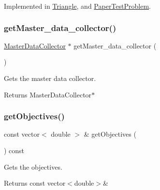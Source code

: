 Implemented in \mbox{\hyperlink{classTriangle_a9e95039d098fd61cce1a830b85ed7004_a9e95039d098fd61cce1a830b85ed7004}{Triangle}}, and \mbox{\hyperlink{classPaperTestProblem_a6db78df74d40f69a750b164caaca75c7_a6db78df74d40f69a750b164caaca75c7}{Paper\+Test\+Problem}}.

\mbox{\label{classProblem_a9bb7f0f4da14050f4a351e5ddb97c380_a9bb7f0f4da14050f4a351e5ddb97c380}} 
\subsubsection{\texorpdfstring{get\+Master\+\_\+data\+\_\+collector()}{getMaster\_data\_collector()}}
{\footnotesize\ttfamily \mbox{\hyperlink{classMasterDataCollector}{Master\+Data\+Collector}} $\ast$ get\+Master\+\_\+data\+\_\+collector (\begin{DoxyParamCaption}{ }\end{DoxyParamCaption})}



Gets the master data collector. 

\begin{DoxyReturn}{Returns}
Master\+Data\+Collector$\ast$ 
\end{DoxyReturn}
\mbox{\label{classProblem_aa10a0c69bf0a3d6a303c118c6fdfd5c6_aa10a0c69bf0a3d6a303c118c6fdfd5c6}} 
\subsubsection{\texorpdfstring{get\+Objectives()}{getObjectives()}}
{\footnotesize\ttfamily const vector$<$ double $>$ \& get\+Objectives (\begin{DoxyParamCaption}{ }\end{DoxyParamCaption}) const}



Gets the objectives. 

\begin{DoxyReturn}{Returns}
const vector$<$double$>$\& 
\end{DoxyReturn}
\mbox{\label{classProblem_a2458fd2abb3ffaacccf4191a737c9383_a2458fd2abb3ffaacccf4191a737c9383}} 
